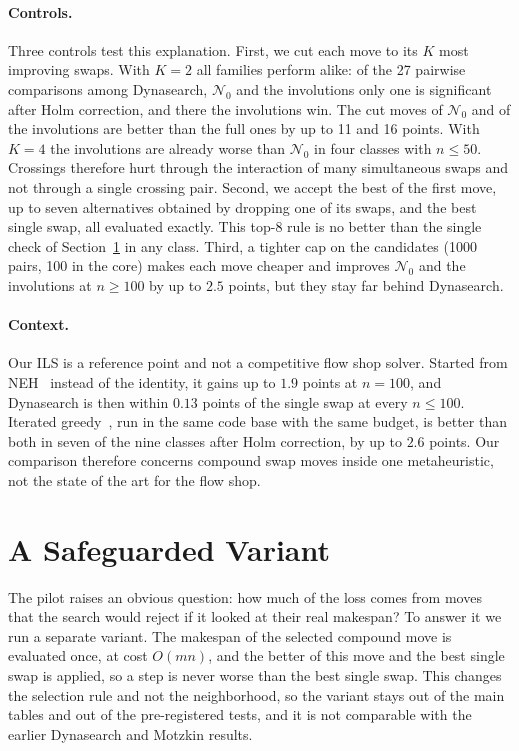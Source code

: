 \documentclass[10pt,twocolumn]{article}
\newcommand{\N}{\mathcal{N}}
\begin{document}
\paragraph{Controls.} Three controls test this explanation. First, we
cut each move to its $K$ most improving swaps. With $K=2$ all families
perform alike: of the 27 pairwise comparisons among Dynasearch, $\N_0$
and the involutions only one is significant after Holm correction, and
there the involutions win. The cut moves of $\N_0$ and of the
involutions are better than the full ones by up to 11 and 16 points.
With $K=4$ the involutions are already worse than $\N_0$ in four
classes with $n\leq50$. Crossings therefore hurt through the
interaction of many simultaneous swaps and not through a single crossing
pair. Second, we accept the best of the first move, up to seven
alternatives obtained by dropping one of its swaps, and the best single
swap, all evaluated exactly. This top-8 rule is no better than the
single check of Section~\ref{sec:safe} in any class. Third, a tighter cap
on the candidates (1000 pairs, 100 in the core) makes each move cheaper
and improves $\N_0$ and the involutions at $n\geq100$ by up to $2.5$
points, but they stay far behind Dynasearch.

\paragraph{Context.} Our ILS is a reference point and not a competitive
flow shop solver. Started from NEH~\cite{nawaz1983} instead of the
identity, it gains up to $1.9$ points at $n=100$, and Dynasearch is then
within $0.13$ points of the single swap at every $n\leq100$. Iterated
greedy~\cite{ruiz2007}, run in the same code base with the same budget,
is better than both in seven of the nine classes after Holm correction,
by up to $2.6$ points. Our comparison therefore concerns compound swap
moves inside one metaheuristic, not the state of the art for the flow
shop.

\section{A Safeguarded Variant}\label{sec:safe}

The pilot raises an obvious question: how much of the loss comes from
moves that the search would reject if it looked at their real makespan?
To answer it we run a separate variant. The makespan of the selected
compound move is evaluated once, at cost $O(mn)$, and the better of this
move and the best single swap is applied, so a step is never worse than
the best single swap. This changes the selection rule and not the
neighborhood, so the variant stays out of the main tables and out of the
pre-registered tests, and it is not comparable with the earlier
Dynasearch and Motzkin results.
\end{document}
